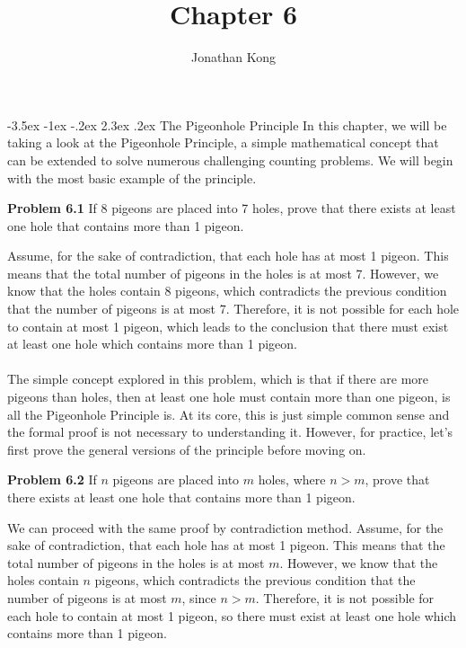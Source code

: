 \documentclass[11pt]{scrartcl}
\title{\normalfont\notesize\textbf{Chapter 6}}
\author{Jonathan Kong}
\date{}
\makeatletter
\DeclarePairedDelimiter
\renewcommand\section{\@startsection{section}{1}{\z@}%
                                   {-3.5ex \@plus -1ex \@minus -.2ex}%
                                   {2.3ex \@plus.2ex}%
                                   {\normalfont\large\bfseries}}
\makeatother
\begin{document}
\maketitle
\section{The Pigeonhole Principle}
In this chapter, we will be taking a look at the Pigeonhole Principle, a simple mathematical concept that can be extended to solve numerous challenging counting problems. We will begin with the most basic example of the principle.    
\\
\begin{tcolorbox}
\textbf{Problem 6.1} If 8 pigeons are placed into 7 holes, prove that there exists at least one hole that contains more than 1 pigeon. 
\end{tcolorbox}
\noindent
Assume, for the sake of contradiction, that each hole has at most 1 pigeon. This means that the total number of pigeons in the holes is at most 7. However, we know that the holes contain 8 pigeons, which contradicts the previous condition that the number of pigeons is at most 7. Therefore, it is not possible for each hole to contain at most 1 pigeon, which leads to the conclusion that there must exist at least one hole which contains more than 1 pigeon. \\
\\
\noindent 
The simple concept explored in this problem, which is that if there are more pigeons than holes, then at least one hole must contain more than one pigeon, is all the Pigeonhole Principle is. At its core, this is just simple common sense and the formal proof is not necessary to understanding it. However,  for practice, let's first prove the general versions of the principle before moving on. 
\\
\begin{tcolorbox}
\textbf{Problem 6.2} If $n$ pigeons are placed into $m$ holes, where $n>m$, prove that there exists at least one hole that contains more than 1 pigeon. 
\end{tcolorbox}
\noindent
We can proceed with the same proof by contradiction method. Assume, for the sake of contradiction, that each hole has at most 1 pigeon. This means that the total number of pigeons in the holes is at most $m$. However, we know that the holes contain $n$ pigeons, which contradicts the previous condition that the number of pigeons is at most $m$, since $n>m$. Therefore, it is not possible for each hole to contain at most 1 pigeon, so there must exist at least one hole which contains more than 1 pigeon. \\
\end{document}
